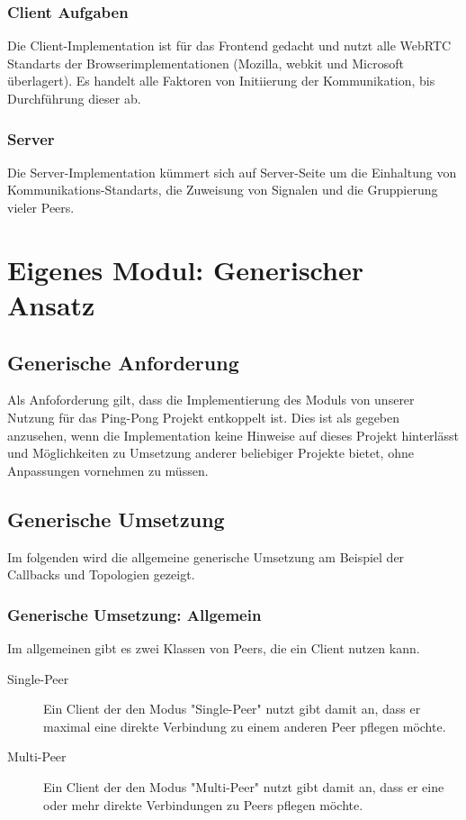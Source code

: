 \subsubsection{Client Aufgaben}
Die Client-Implementation ist für das Frontend gedacht und nutzt alle WebRTC 
Standarts der Browserimplementationen (Mozilla, webkit und Microsoft überlagert). 
Es handelt alle Faktoren von Initiierung der Kommunikation, bis Durchführung dieser ab.



\subsubsection{Server}
Die Server-Implementation kümmert sich auf Server-Seite um die Einhaltung von 
Kommunikations-Standarts, die Zuweisung von Signalen und die Gruppierung vieler 
Peers.



\section{Eigenes Modul: Generischer Ansatz}

\subsection{Generische Anforderung}
Als Anfoforderung gilt, dass die Implementierung des Moduls von unserer Nutzung für das Ping-Pong Projekt entkoppelt ist. Dies ist als gegeben anzusehen, wenn die Implementation keine Hinweise auf dieses Projekt hinterlässt und Möglichkeiten zu Umsetzung anderer beliebiger Projekte bietet, ohne Anpassungen vornehmen zu müssen.



\subsection{Generische Umsetzung}
Im folgenden wird die allgemeine generische Umsetzung am Beispiel der Callbacks und Topologien gezeigt.

\subsubsection{Generische Umsetzung: Allgemein}
Im allgemeinen gibt es zwei Klassen von Peers, die ein Client nutzen kann.
\begin{description}
\item[Single-Peer]
Ein Client der den Modus "Single-Peer" nutzt gibt damit an, dass er maximal eine direkte Verbindung zu einem anderen Peer pflegen möchte.

\item[Multi-Peer]
Ein Client der den Modus "Multi-Peer" nutzt gibt damit an, dass er eine oder mehr direkte Verbindungen zu Peers pflegen möchte.
\end{description}

